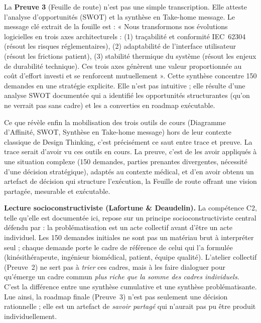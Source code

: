 La \textbf{Preuve 3} (Feuille de route) n'est pas une simple transcription. Elle atteste l'analyse d'opportunités (SWOT) et la synthèse en Take-home message. Le message clé extrait de la fouille est : « Nous transformons nos évolutions logicielles en trois axes architecturels : (1) traçabilité et conformité IEC~62304 (résout les risques réglementaires), (2) adaptabilité de l'interface utilisateur (résout les frictions patient), (3) stabilité thermique du système (résout les enjeux de durabilité technique). Ces trois axes génèrent une valeur proportionnée au coût d'effort investi et se renforcent mutuellement ». Cette synthèse concentre 150 demandes en une stratégie explicite. Elle n'est pas intuitive ; elle résulte d'une analyse SWOT documentée qui a identifié les opportunités structurantes (qu'on ne verrait pas sans cadre) et les a converties en roadmap exécutable.

Ce que révèle enfin la mobilisation des trois outils de cours (Diagramme d'Affinité, SWOT, Synthèse en Take-home message) hors de leur contexte classique de Design Thinking, c'est précisément ce saut entre trace et preuve. La trace serait d'avoir vu ces outils en cours. La preuve, c'est de les avoir appliqués à une situation complexe (150 demandes, parties prenantes divergentes, nécessité d'une décision stratégique), adaptés au contexte médical, et d'en avoir obtenu un artefact de décision qui structure l'exécution, la Feuille de route offrant une vision partagée, mesurable et exécutable.

\medskip

\textbf{Lecture socioconstructiviste (Lafortune \& Deaudelin).}
La compétence C2, telle qu'elle est documentée ici, repose sur un principe socioconstructiviste central défendu par \citet{lafortune2001} : la problématisation est un acte collectif avant d'être un acte individuel. Les 150 demandes initiales ne sont pas un matériau brut à interpréter seul ; chaque demande porte le cadre de référence de celui qui l'a formulée (kinésithérapeute, ingénieur biomédical, patient, équipe qualité). L'atelier collectif (Preuve~2) ne sert pas à \emph{trier} ces cadres, mais à les faire dialoguer pour qu'émerge un cadre commun \emph{plus riche que la somme des cadres individuels}. C'est la différence entre une synthèse cumulative et une synthèse problématisante. Lue ainsi, la roadmap finale (Preuve~3) n'est pas seulement une décision rationnelle ; elle est un artefact de \emph{savoir partagé} qui n'aurait pas pu être produit individuellement.

